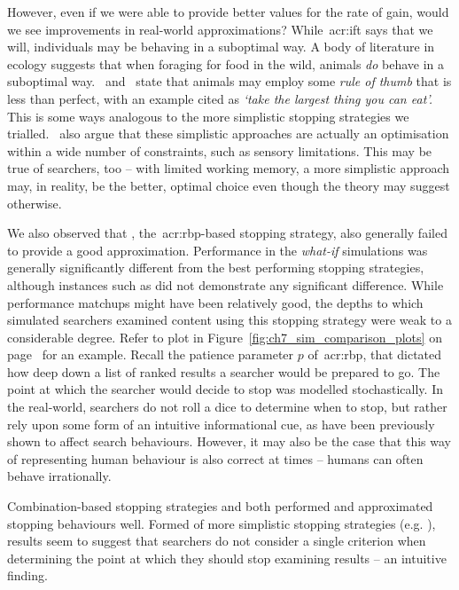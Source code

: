 However, even if we were able to provide better values for the rate of gain, would we see improvements in real-world approximations? While~\gls{acr:ift} says that we will, individuals may be behaving in a suboptimal way. A body of literature in ecology suggests that when foraging for food in the wild, animals \emph{do} behave in a suboptimal way.~\cite{janetos1981imperfectly} and~\cite{krebs1983perspectives} state that animals may employ some \emph{rule of thumb} that is less than perfect, with an example cited as \emph{`take the largest thing you can eat'.} This is some ways analogous to the more simplistic stopping strategies we trialled.~\cite{krebs1983perspectives} also argue that these simplistic approaches are actually an optimisation within a wide number of constraints, such as sensory limitations. This may be true of searchers, too -- with limited working memory, a more simplistic approach may, in reality, be the better, optimal choice even though the theory may suggest otherwise.

We also observed that , the~\gls{acr:rbp}-based stopping strategy, also generally failed to provide a good approximation. Performance in the \emph{what-if} simulations was generally significantly different from the best performing stopping strategies, although instances such as  did not demonstrate any significant difference. While performance matchups might have been relatively good, the depths to which simulated searchers examined content using this stopping strategy were weak to a considerable degree. Refer to plot  in Figure~\ref{fig:ch7_sim_comparison_plots} on page~\pageref{fig:ch7_sim_comparison_plots} for an example. Recall the patience parameter $p$ of~\gls{acr:rbp}, that dictated how deep down a list of ranked results a searcher would be prepared to go. The point at which the searcher would decide to stop was modelled stochastically. In the real-world, searchers do not roll a dice to determine when to stop, but rather rely upon some form of an intuitive informational cue, as have been previously shown to affect search behaviours. However, it may also be the case that this way of representing human behaviour is also correct at times -- humans can often behave irrationally.

Combination-based stopping strategies  and  both performed and approximated stopping behaviours well. Formed of more simplistic stopping strategies (e.g. ), results seem to suggest that searchers do not consider a single criterion when determining the point at which they should stop examining results -- an intuitive finding.

